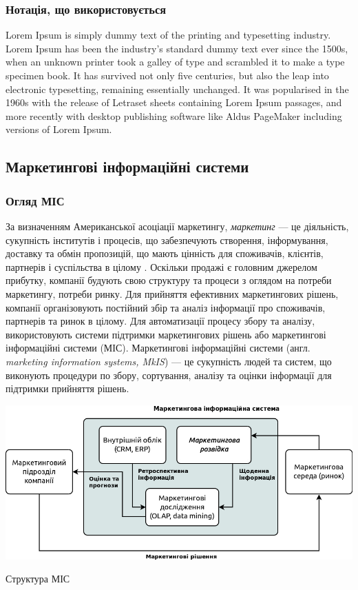 \subsubsection{Нотація, що використовується}
Lorem Ipsum is simply dummy text of the printing and typesetting industry. Lorem Ipsum has been the industry's standard dummy text ever since the 1500s, when an unknown printer took a galley of type and scrambled it to make a type specimen book. It has survived not only five centuries, but also the leap into electronic typesetting, remaining essentially unchanged. It was popularised in the 1960s with the release of Letraset sheets containing Lorem Ipsum passages, and more recently with desktop publishing software like Aldus PageMaker including versions of Lorem Ipsum.

\subsection{Маркетингові інформаційні системи}

\subsubsection{Огляд МІС} %
За визначенням Американської асоціації маркетингу, {\it маркетинг} --- це діяльність, сукупність інститутів і процесів, що забезпечують створення, інформування, доставку та обмін пропозицій, що мають цінність для споживачів, клієнтів, партнерів і суспільства в цілому \cite{kotler14}. Оскільки продажі є головним джерелом прибутку, компанії будують свою структуру та процеси з оглядом на потреби маркетингу, потреби ринку. Для прийняття ефективних маркетингових рішень, компанії організовують постійний збір та аналіз інформації про споживачів, партнерів та ринок в цілому. Для автоматизації процесу збору та аналізу, використовують системи підтримки маркетингових рішень або маркетингові інформаційні системи (МІС). Маркетингові інформаційні системи (англ. {\it marketing information systems, MkIS}) --- це сукупність людей та систем, що виконують процедури по збору, сортування, аналізу та оцінки інформації для підтримки прийняття рішень.

\begin{stdfigure}
\includegraphics[width=6in]{images/mis_structure.png}
\caption{Структура МІС}
\label{fig:mis_structure}
\end{stdfigure}
 
